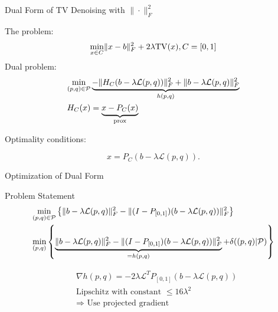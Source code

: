 \documentclass[12pt]{beamer}
\DeclarePairedDelimiter{\norm}{\lVert}{\rVert}
\begin{document}
\begin{frame}{Dual Form of TV Denoising with $\|\cdot \|_F^2$}

The problem:
$$ \min_{x \in C} \norm{x - b}_F^2 + 2 \lambda \mathrm{TV}(x), C = [0,1] $$ 
Dual problem: 
\begin{align*}
\min_{(p,q) \in \mathcal{P} } & \underbrace{- \norm{ H_C (b- \lambda \mathcal{L}(p,q) ) }_F^2 + \norm{ b - \lambda \mathcal{L}(p,q) }_F^2}_{h(p,q)} \\
H_C(x) & = \underbrace{x - P_C (x)}_{\mathrm{prox}}
\end{align*}

Optimality conditions: 

$$ x = P_C(b - \lambda \mathcal{L}(p,q) ).$$

\end{frame}

\begin{frame}{Optimization of Dual Form}

\begin{exampleblock}{Problem Statement}
\vspace{-5 mm}
\begin{align*}
&\underset{(p,q) \in \mathcal{P} }{\text{min}}  \left\{  \norm{b - \lambda \mathcal{L} (p,q)}_F^2 - \norm{(I-P_{[0,1]}) (b - \lambda \mathcal{L} (p,q))}_F^2   \right\}\\
&\underset{(p,q) }{\text{min}}  \left\{  \underbrace{\norm{b - \lambda \mathcal{L} (p,q)}_F^2 - \norm{(I-P_{[0,1]}) (b - \lambda \mathcal{L} (p,q))}_F^2}_{= h(p,q)} + \delta((p,q) | \mathcal{P})   \right\}
\end{align*}
\end{exampleblock}

\begin{exampleblock}{}
\begin{align*}
&\nabla h (p,q) = -2\lambda \mathcal{L}^TP_{[0,1]} (b - \lambda \mathcal{L}(p,q)) \\
&\text{Lipschitz with constant } \leq 16\lambda^2\\
&\Rightarrow \text{ Use projected gradient}
\end{align*}
\end{exampleblock}

\end{frame}
\end{document}

